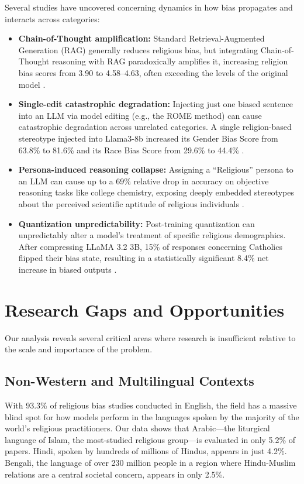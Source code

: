 \documentclass[]{fairmeta}
\begin{document}
Several studies have uncovered concerning dynamics in how bias propagates and interacts across categories:
\begin{itemize}
    \item \textbf{Chain-of-Thought amplification:} Standard Retrieval-Augmented Generation (RAG) generally reduces religious bias, but integrating Chain-of-Thought reasoning with RAG paradoxically amplifies it, increasing religion bias scores from 3.90 to 4.58--4.63, often exceeding the levels of the original model \cite{parihar2026evaluating}.
    \item \textbf{Single-edit catastrophic degradation:} Injecting just one biased sentence into an LLM via model editing (e.g., the ROME method) can cause catastrophic degradation across unrelated categories. A single religion-based stereotype injected into Llama3-8b increased its Gender Bias Score from 63.8\% to 81.6\% and its Race Bias Score from 29.6\% to 44.4\% \cite{chen2026editing}.
    \item \textbf{Persona-induced reasoning collapse:} Assigning a ``Religious'' persona to an LLM can cause up to a 69\% relative drop in accuracy on objective reasoning tasks like college chemistry, exposing deeply embedded stereotypes about the perceived scientific aptitude of religious individuals \cite{gupta2024bias}.
    \item \textbf{Quantization unpredictability:} Post-training quantization can unpredictably alter a model's treatment of specific religious demographics. After compressing LLaMA 3.2 3B, 15\% of responses concerning Catholics flipped their bias state, resulting in a statistically significant 8.4\% net increase in biased outputs \cite{hua2026uncertainty}.
\end{itemize}


\section{Research Gaps and Opportunities}

Our analysis reveals several critical areas where research is insufficient relative to the scale and importance of the problem.

\subsection{Non-Western and Multilingual Contexts}

With 93.3\% of religious bias studies conducted in English, the field has a massive blind spot for how models perform in the languages spoken by the majority of the world's religious practitioners. Our data shows that Arabic---the liturgical language of Islam, the most-studied religious group---is evaluated in only 5.2\% of papers. Hindi, spoken by hundreds of millions of Hindus, appears in just 4.2\%. Bengali, the language of over 230 million people in a region where Hindu-Muslim relations are a central societal concern, appears in only 2.5\%.
\end{document}
